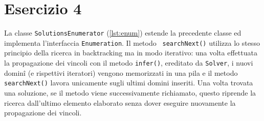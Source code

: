 \section{Esercizio 4}

La classe {\tt SolutionsEnumerator} (\autoref{lst:enum}) estende la precedente
classe ed implementa l'interfaccia {\tt Enumeration}. Il metodo {\tt
searchNext()} utilizza lo stesso principio della ricerca in backtracking ma in
modo iterativo: una volta effettuata la propagazione dei vincoli con il metodo
{\tt infer()}, ereditato da {\tt Solver}, i nuovi dominî (e rispettivi
iteratori) vengono memorizzati in una pila e il metodo {\tt searchNext()} lavora
unicamente sugli ultimi domini inseriti. Una volta trovata una soluzione, se il
metodo viene successivamente richiamato, questo riprende la ricerca dall'ultimo
elemento elaborato senza dover eseguire nuovamente la propagazione dei vincoli.


